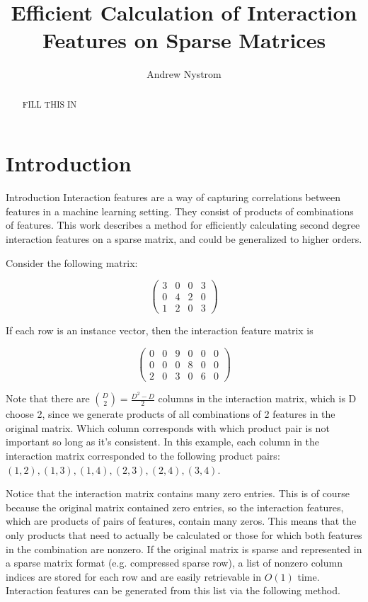 \documentclass[11pt]{article}
\begin{document}
\title{Efficient Calculation of Interaction Features on Sparse Matrices}
\author{Andrew Nystrom}
\date{}

\maketitle

\begin{abstract}%
FILL THIS IN
\end{abstract}

\section{Introduction}

Introduction
Interaction features are a way of capturing correlations between features in a machine 
learning setting. They consist of products of combinations of features. This work 
describes a method for efficiently calculating second degree interaction features on a 
sparse matrix, and could be generalized to higher orders.

Consider the following matrix:

\[ \left( \begin{array}{cccc}
3 & 0 & 0 & 3 \\
0 & 4 & 2 & 0 \\
1 & 2 & 0 & 3 \end{array} \right)\]


If each row is an instance vector, then the interaction feature matrix is

\[ \left( \begin{array}{cccccc}
0 & 0 & 9 & 0 & 0 & 0 \\
0 & 0 & 0 & 8 & 0 & 0 \\
2 & 0 & 3 & 0 & 6 & 0 \end{array} \right)\]

Note that there are $\binom{D}{2} = \frac{D^2-D}{2}$ columns in the interaction matrix, which is D choose 2, 
since we generate products of all combinations of 2 features in the original matrix. 
Which column corresponds with which product pair is not important so long as it’s 
consistent. In this example, each column in the interaction matrix corresponded to the 
following product pairs: $(1, 2),  (1, 3),  (1, 4),  (2, 3), ( 2, 4), (3, 4)$.

Notice that the interaction matrix contains many zero entries. This is of course because 
the original matrix contained zero entries, so the interaction features, which are 
products of pairs of features, contain many zeros. This means that the only products that 
need to actually be calculated or those for which both features in the combination are 
nonzero. If the original matrix is sparse and represented in a sparse matrix format 
(e.g. compressed sparse row), a list of nonzero column indices are stored for each row 
and are easily retrievable in $O(1)$ time. Interaction features can be generated from this 
list via the following method.
\end{document}
